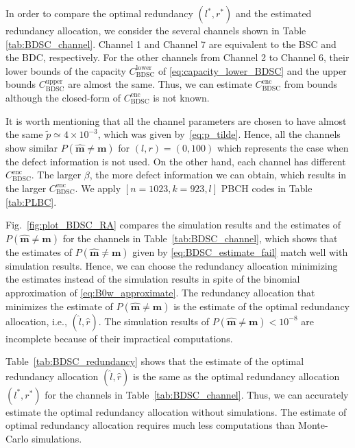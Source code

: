 \documentclass[10pt,twocolumn,twoside,submit]{JCNtran}
\begin{document}
	In order to compare the optimal redundancy $(l^*, r^*)$ and the estimated redundancy allocation, we consider the several channels shown in Table \ref{tab:BDSC_channel}. Channel 1 and Channel 7 are equivalent to the BSC and the BDC, respectively. For the other channels from Channel 2 to Channel 6, their lower bounds of the capacity $C_{\text{BDSC}}^{\text{lower}}$ of \eqref{eq:capacity_lower_BDSC} and the upper bounds $C_{\text{BDSC}}^{\text{upper}}$ are almost the same. Thus, we can estimate $C_{\text{BDSC}}^{\text{enc}}$ from bounds although the closed-form of $C_{\text{BDSC}}^{\text{enc}}$ is not known. 
	
	
	It is worth mentioning that all the channel parameters are chosen to have almost the same $\widetilde{p} \simeq 4 \times 10^{-3}$, which was given by~\eqref{eq:p_tilde}. Hence, all the channels show similar $P\left( \widehat{\mathbf{m}} \ne \mathbf{m} \right)$ for $(l, r) = (0, 100)$ which represents the case when the defect information is not used. On the other hand, each channel has different $C_{\text{BDSC}}^{\text{enc}}$. The larger $\beta$, the more defect information we can obtain, which results in the larger $C_{\text{BDSC}}^{\text{enc}}$. We apply $\left[ n = 1023, k=923, l \right]$ PBCH codes in Table \ref{tab:PLBC}.	
	
	Fig.~\ref{fig:plot_BDSC_RA} compares the simulation results and the estimates of $P\left( \widehat{\mathbf{m}} \ne \mathbf{m} \right)$ for the channels in Table~\ref{tab:BDSC_channel}, which shows that the estimates of $P\left( \widehat{\mathbf{m}} \ne \mathbf{m} \right)$ given by \eqref{eq:BDSC_estimate_fail} match well with simulation results. Hence, we can choose the redundancy allocation minimizing the estimates instead of the simulation results in spite of the binomial approximation of \eqref{eq:B0w_approximate}. The redundancy allocation that minimizes the estimate of $P\left( \widehat{\mathbf{m}} \ne \mathbf{m} \right)$ is the estimate of the optimal redundancy allocation, i.e., $(\widehat{l}, \widehat{r})$. The simulation results of $P\left( \widehat{\mathbf{m}} \ne \mathbf{m} \right) < 10^{-8}$ are incomplete because of their impractical computations. 
	
	Table~\ref{tab:BDSC_redundancy} shows that the estimate of the optimal redundancy allocation $(\widehat{l}, \widehat{r})$ is the same as the optimal redundancy allocation $(l^*, r^*)$ for the channels in Table~\ref{tab:BDSC_channel}. Thus, we can accurately estimate the optimal redundancy allocation without simulations. The estimate of optimal redundancy allocation requires much less computations than Monte-Carlo simulations.
\end{document}
